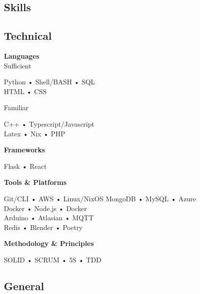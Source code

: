 \documentclass[11pt, twoside, a4paper, titlepage]{article}
\begin{document}
\vspace{-0.6cm}
\begin{tcolorbox}[boxsep=0mm, left=0mm, right=0mm, top=0mm, bottom=0mm, height=23cm]
	\begin{minipage}[t]{6.01cm}
		\begin{tcolorbox}[colframe=black, colback=black, arc=0mm, sharp corners, fontupper=\color{white}, height=22.9cm]
			\section*{Skills}
			
			\subsection*{Technical}
			\textbf{Languages}\\
			\large{Sufficient}\\
			\small
			\parbox{5cm}{Python • Shell/BASH • SQL \\ HTML • CSS }
			
			\vspace*{0.2cm}
			
			\large{Familiar}\\
			\small
			\parbox{5cm}{C++ • Typescript/Javascript \\ Latex • Nix • PHP }
			
			\vspace*{0.4cm}
			
			\textbf{Frameworks}\\
			\parbox{5cm}{Flask • React}
			
			\vspace*{0.4cm}
			
			\textbf{Tools \& Platforms}\\
			\parbox{5cm}{Git/CLI • AWS • Linux/NixOS  MongoDB • MySQL • Azure \\ Docker • Node.js • Docker \\ Arduino • Atlasian • MQTT \\ Redis • Blender • Poetry }
			
			\vspace*{0.4cm}
			
			\textbf{Methodology \& Principles}\\
			\parbox{5cm}{SOLID • SCRUM • 5S • TDD }
			
			\subsection*{General}
			

\end{tcolorbox}
\end{minipage}
\end{tcolorbox}
\end{document}
